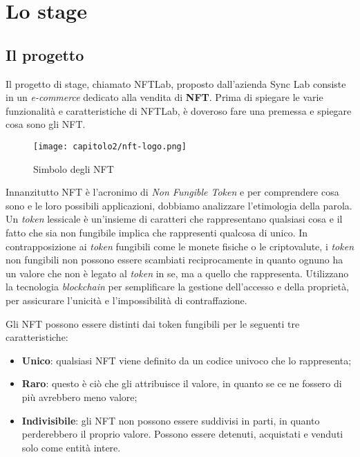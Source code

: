
\chapter{Lo stage}
\label{cap:stage}


\section{Il progetto}
Il progetto di stage, chiamato NFTLab, proposto dall'azienda Sync Lab consiste in un \emph{e-commerce} dedicato alla vendita di \textbf{NFT}. Prima di spiegare le varie funzionalità e caratteristiche di NFTLab, è doveroso fare una premessa e spiegare cosa sono gli NFT. \\

\begin{figure}[!h]
  \centering
  \texttt{[image: capitolo2/nft-logo.png]}
  \caption{Simbolo degli NFT}
\end{figure}

Innanzitutto NFT è l'acronimo di \emph{Non Fungible Token} e per comprendere cosa sono e le loro possibili applicazioni, dobbiamo analizzare l'etimologia della parola. 
Un \emph{token} lessicale è un'insieme di caratteri che rappresentano qualsiasi cosa e il fatto che sia non fungibile implica che rappresenti qualcosa di unico. 
In contrapposizione ai \emph{token} fungibili come le monete fisiche o le \gls{criptovalute}, i \emph{token} non fungibili non possono essere scambiati reciprocamente in quanto ognuno ha un valore che non è legato al \emph{token} in se, ma a quello che rappresenta.
Utilizzano la tecnologia \emph{blockchain} per semplificare la gestione dell'accesso e della proprietà, per assicurare l'unicità e l'impossibilità di contraffazione.

Gli NFT possono essere distinti dai token fungibili per le seguenti tre caratteristiche:
\begin{itemize}
  \item \textbf{Unico}: qualsiasi NFT viene definito da un codice univoco che lo rappresenta;
  \item \textbf{Raro}: questo è ciò che gli attribuisce il valore, in quanto se ce ne fossero di più avrebbero meno valore;
  \item \textbf{Indivisibile}: gli NFT non possono essere suddivisi in parti, in quanto perderebbero il proprio valore. Possono essere detenuti, acquistati e venduti solo come entità intere.
\end{itemize}

